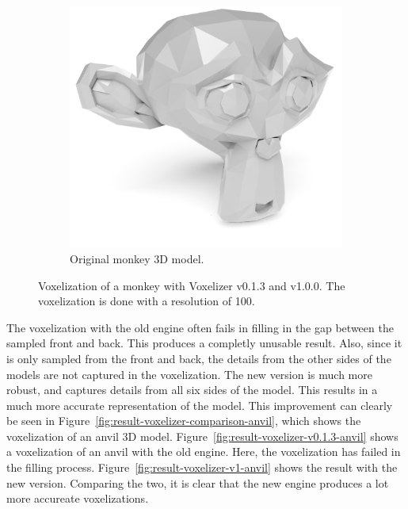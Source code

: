 \begin{figure}[hp]
\begin{subfigure}[b]{0.50\textwidth}
    \end{subfigure}
    \par\bigskip
    \begin{subfigure}[b]{0.43\textwidth}
        \centering
        \includegraphics[width=\textwidth]{sections/theory/figures/monkey.png}
        \caption{Original monkey 3D model.}
        \label{fig:result-original-monkey}
    \end{subfigure}
    \hfill
    \caption{Voxelization of a monkey with Voxelizer v0.1.3 and v1.0.0. The voxelization is done with a resolution of 100.}
    \label{fig:result-voxelizer-comparison-monkey}
\end{figure}
\clearpage
The voxelization with the old engine often fails in filling in the gap between the sampled front and back. This produces a completly unusable result. Also, since it is only sampled from the front and back, the details from the other sides of the models are not captured in the voxelization. The new version is much more robust, and captures details from all six sides of the model. This results in a much more accurate representation of the model. This improvement can clearly be seen in Figure~\ref{fig:result-voxelizer-comparison-anvil}, which shows the voxelization of an anvil 3D model. Figure~\ref{fig:result-voxelizer-v0.1.3-anvil} shows a voxelization of an anvil with the old engine. Here, the voxelization has failed in the filling process. Figure~\ref{fig:result-voxelizer-v1-anvil} shows the result with the new version. Comparing the two, it is clear that the new engine produces a lot more accureate voxelizations.
